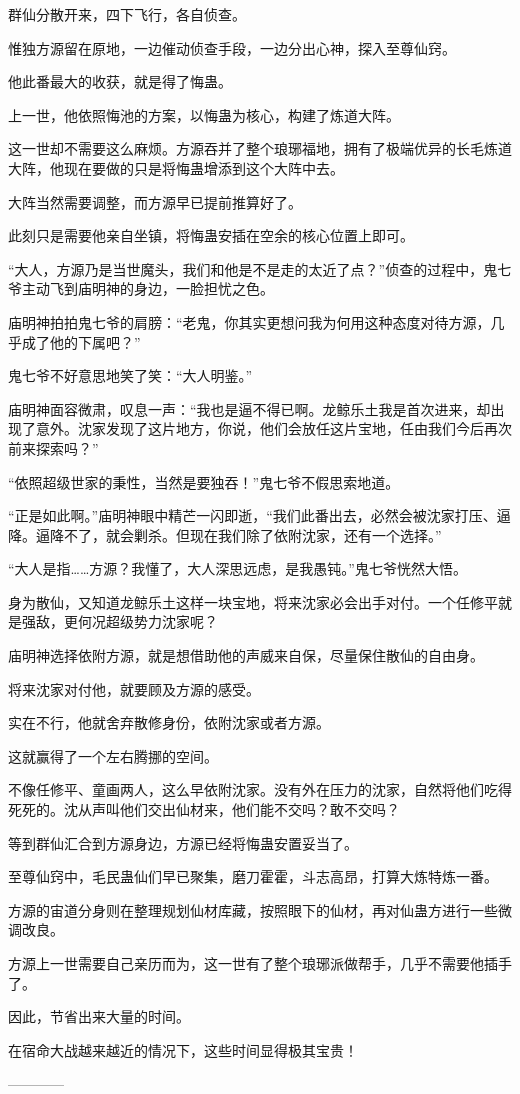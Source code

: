 \begin{this_body}
群仙分散开来，四下飞行，各自侦查。

惟独方源留在原地，一边催动侦查手段，一边分出心神，探入至尊仙窍。

他此番最大的收获，就是得了悔蛊。

上一世，他依照悔池的方案，以悔蛊为核心，构建了炼道大阵。

这一世却不需要这么麻烦。方源吞并了整个琅琊福地，拥有了极端优异的长毛炼道大阵，他现在要做的只是将悔蛊增添到这个大阵中去。

大阵当然需要调整，而方源早已提前推算好了。

此刻只是需要他亲自坐镇，将悔蛊安插在空余的核心位置上即可。

“大人，方源乃是当世魔头，我们和他是不是走的太近了点？”侦查的过程中，鬼七爷主动飞到庙明神的身边，一脸担忧之色。

庙明神拍拍鬼七爷的肩膀：“老鬼，你其实更想问我为何用这种态度对待方源，几乎成了他的下属吧？”

鬼七爷不好意思地笑了笑：“大人明鉴。”

庙明神面容微肃，叹息一声：“我也是逼不得已啊。龙鲸乐土我是首次进来，却出现了意外。沈家发现了这片地方，你说，他们会放任这片宝地，任由我们今后再次前来探索吗？”

“依照超级世家的秉性，当然是要独吞！”鬼七爷不假思索地道。

“正是如此啊。”庙明神眼中精芒一闪即逝，“我们此番出去，必然会被沈家打压、逼降。逼降不了，就会剿杀。但现在我们除了依附沈家，还有一个选择。”

“大人是指……方源？我懂了，大人深思远虑，是我愚钝。”鬼七爷恍然大悟。

身为散仙，又知道龙鲸乐土这样一块宝地，将来沈家必会出手对付。一个任修平就是强敌，更何况超级势力沈家呢？

庙明神选择依附方源，就是想借助他的声威来自保，尽量保住散仙的自由身。

将来沈家对付他，就要顾及方源的感受。

实在不行，他就舍弃散修身份，依附沈家或者方源。

这就赢得了一个左右腾挪的空间。

不像任修平、童画两人，这么早依附沈家。没有外在压力的沈家，自然将他们吃得死死的。沈从声叫他们交出仙材来，他们能不交吗？敢不交吗？

等到群仙汇合到方源身边，方源已经将悔蛊安置妥当了。

至尊仙窍中，毛民蛊仙们早已聚集，磨刀霍霍，斗志高昂，打算大炼特炼一番。

方源的宙道分身则在整理规划仙材库藏，按照眼下的仙材，再对仙蛊方进行一些微调改良。

方源上一世需要自己亲历而为，这一世有了整个琅琊派做帮手，几乎不需要他插手了。

因此，节省出来大量的时间。

在宿命大战越来越近的情况下，这些时间显得极其宝贵！

------------

\end{this_body}

